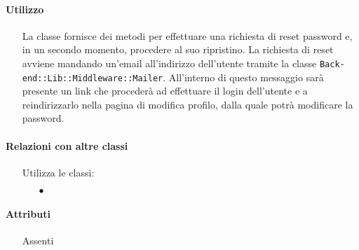 \paragraph*{Utilizzo}
\begin{itemize}
\item[] La classe fornisce dei metodi per effettuare una richiesta di reset password e, in un secondo momento, procedere al suo ripristino. La richiesta di reset avviene mandando un'email all'indirizzo dell'utente tramite la classe \texttt{Back-end::Lib::Middleware::Mailer}. All'interno di questo messaggio sarà presente un link che procederà ad effettuare il login dell'utente e a reindirizzarlo nella pagina di modifica profilo, dalla quale potrà modificare la password.
\end{itemize}

\paragraph*{Relazioni con altre classi}
\begin{itemize}


\item[] Utilizza le classi:
\begin{itemize}
\item[$\bullet$] 
\end{itemize}
\end{itemize}

\paragraph*{Attributi}
\begin{itemize}
\item[] Assenti
\end{itemize}

